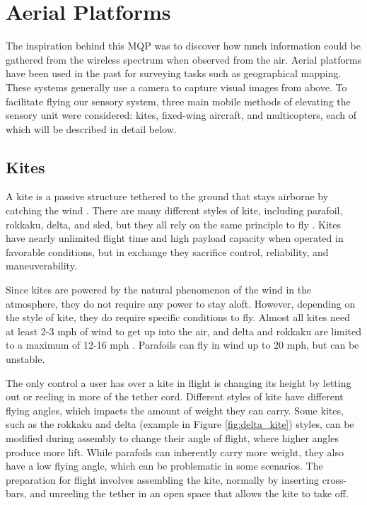 \section{Aerial Platforms}
The inspiration behind this MQP was to discover how much information could be gathered from the wireless spectrum when observed from the air. Aerial platforms have been used in the past for surveying tasks such as geographical mapping. \cite{geomap_patent} These systems generally use a camera to capture visual images from above. To facilitate flying our sensory system, three main mobile methods of elevating the sensory unit were considered: kites, fixed-wing aircraft, and multicopters, each of which will be described in detail below.

\subsection{Kites}
A kite is a passive structure tethered to the ground that stays airborne by catching the wind \cite{kite_book}. There are many different styles of kite, including parafoil, rokkaku, delta, and sled, but they all rely on the same principle to fly \cite{kite_book} \cite{kite_iqp}. Kites have nearly unlimited flight time and high payload capacity when operated in favorable conditions, but in exchange they sacrifice control, reliability, and maneuverability.\par
Since kites are powered by the natural phenomenon of the wind in the atmosphere, they do not require any power to stay aloft. However, depending on the style of kite, they do require specific conditions to fly. Almost all kites need at least 2-3 mph of wind to get up into the air, and delta and rokkaku are limited to a maximum of 12-16 mph \cite{kite_iqp}. Parafoils can fly in wind up to 20 mph, but can be unstable.\par
The only control a user has over a kite in flight is changing its height by letting out or reeling in more of the tether cord. Different styles of kite have different flying angles, which impacts the amount of weight they can carry. Some kites, such as the rokkaku and delta (example in Figure \ref{fig:delta_kite}) styles, can be modified during assembly to change their angle of flight, where higher angles produce more lift. While parafoils can inherently carry more weight, they also have a low flying angle, which can be problematic in some scenarios. The preparation for flight involves assembling the kite, normally by inserting cross-bars, and unreeling the tether in an open space that allows the kite to take off.\par
